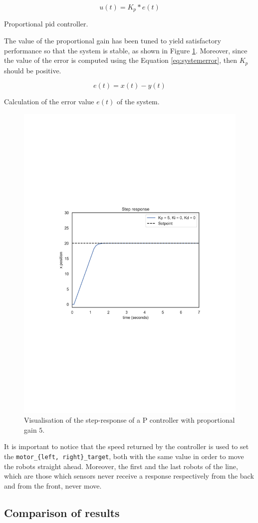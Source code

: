 \begin{Equation}[!h]
	\centering
	\begin{equation}
	u(t) = K_p * e(t)
	\end{equation}
	\caption[Proportioal PID controller.]{Proportional \gls{pid} controller.}
	\label{eq:pid}
\end{Equation}

The value of the proportional gain has been tuned to yield satisfactory 
performance so that the system is stable, as shown in Figure \ref{fig:pid}. 
Moreover, since the value of the error is computed using the Equation 
\ref{eq:systemerror}, then $K_p$ should be positive.

\begin{Equation}[!h]
	\centering
	\begin{equation}
	e(t) = x(t) - y(t)
	\end{equation}
	\caption{Calculation of the error value $e(t)$ of the system.}
	\label{eq:systemerror}
\end{Equation}

\begin{figure}[htb]
	\centering
	\includegraphics[width=.5\textwidth]{contents/images/Step-responsep=kp5ki0kd0}
	\caption[Step response of the proportinal PID controller.]{Visualisation of the 
	step-response of a P controller with proportional 
	gain $5$.}
	\label{fig:pid}
\end{figure}

It is important to notice that the speed returned by the controller is used to set the 
\texttt{motor\_\{left, right\}\_target}, both with the same value in order to move 
the robots straight ahead. Moreover, the first and the last robots of the line, which 
are those which sensors never receive a response respectively from the back and 
from the front, never move.




\subsection{Comparison of results}
\label{subsec:results1}

